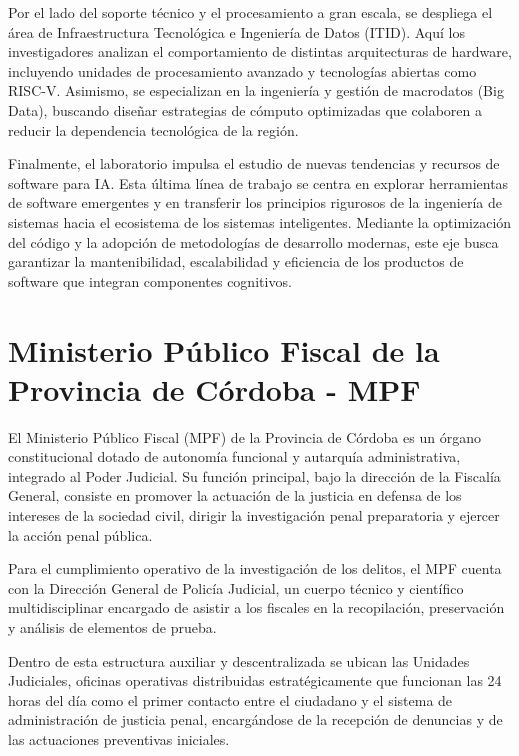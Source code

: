 Por el lado del soporte técnico y el procesamiento a gran escala, se despliega el área de Infraestructura Tecnológica e Ingeniería de Datos (ITID). Aquí los investigadores analizan el comportamiento de distintas arquitecturas de hardware, incluyendo unidades de procesamiento avanzado y tecnologías abiertas como RISC-V. Asimismo, se especializan en la ingeniería y gestión de macrodatos (Big Data), buscando diseñar estrategias de cómputo optimizadas que colaboren a reducir la dependencia tecnológica de la región.

Finalmente, el laboratorio impulsa el estudio de nuevas tendencias y recursos de software para IA. Esta última línea de trabajo se centra en explorar herramientas de software emergentes y en transferir los principios rigurosos de la ingeniería de sistemas hacia el ecosistema de los sistemas inteligentes. Mediante la optimización del código y la adopción de metodologías de desarrollo modernas, este eje busca garantizar la mantenibilidad, escalabilidad y eficiencia de los productos de software que integran componentes cognitivos.

\section{Ministerio Público Fiscal de la Provincia de Córdoba - MPF}\label{ministerio-publico-fiscal-de-la-provincia-de-cuxf3rdoba---mpf}

El Ministerio Público Fiscal (MPF) de la Provincia de Córdoba es un órgano constitucional dotado de autonomía funcional y autarquía administrativa, integrado al Poder Judicial. Su función principal, bajo la dirección de la Fiscalía General, consiste en promover la actuación de la justicia en defensa de los intereses de la sociedad civil, dirigir la investigación penal preparatoria y ejercer la acción penal pública.

Para el cumplimiento operativo de la investigación de los delitos, el MPF cuenta con la Dirección General de Policía Judicial, un cuerpo técnico y científico multidisciplinar encargado de asistir a los fiscales en la recopilación, preservación y análisis de elementos de prueba.

Dentro de esta estructura auxiliar y descentralizada se ubican las Unidades Judiciales, oficinas operativas distribuidas estratégicamente que funcionan las 24 horas del día como el primer contacto entre el ciudadano y el sistema de administración de justicia penal, encargándose de la recepción de denuncias y de las actuaciones preventivas iniciales.

